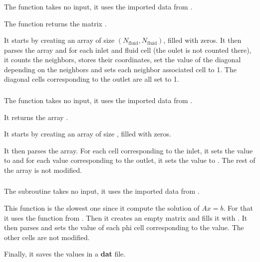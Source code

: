 \subsubsection{\textcolor{func}{}}
The function \textcolor{func}{} takes no input, it uses the imported data from
.

The function returns the matrix .

It starts by creating an array  of size
$(N_{\text{fluid}}, N_{\text{fluid}})$, filled with zeros. It then
parses the array  and for each inlet and fluid cell (the oulet
is not counted there), it counts the neighbors, stores their coordinates,
set the value of the diagonal depending on the neighbors and sets each
neighbor associated cell to 1. The diagonal cells corresponding to the outlet
are all set to 1.

\subsubsection{\textcolor{func}{}}
The function \textcolor{func}{} takes no input, it uses the
imported data from .

It returns the array .

It starts by creating an array  of size
, filled with zeros.

It then parses the array. For each cell corresponding to the inlet, it sets the
value to  and for each value corresponding to the outlet, it sets
the value to . The rest of the array is not modified.

\subsubsection{\textcolor{func}{}}
The subroutine \textcolor{func}{} takes no input, it uses the
imported data from .

This function is the slowest one since it compute the solution of $Ax = b$. For
that it uses the function  from . Then it creates
an empty matrix  and fills it with . It then parses
 and sets the value of each phi cell corresponding to the  value.
The other cells are not modified.

Finally, it saves the values in a \textbf{dat} file.

